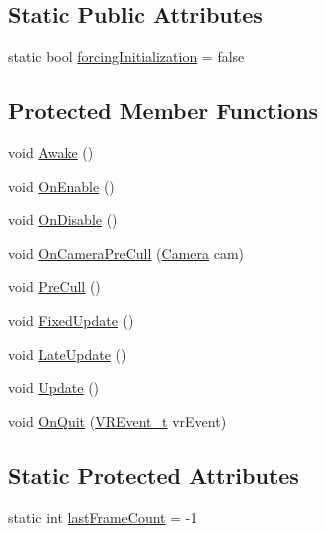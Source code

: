 \subsection*{Static Public Attributes}
\begin{DoxyCompactItemize}
\item 
static bool \mbox{\hyperlink{class_valve_1_1_v_r_1_1_steam_v_r___behaviour_ac7b9c49b43ec24d3bfdb8f73a3573a9e}{forcing\+Initialization}} = false
\end{DoxyCompactItemize}
\subsection*{Protected Member Functions}
\begin{DoxyCompactItemize}
\item 
void \mbox{\hyperlink{class_valve_1_1_v_r_1_1_steam_v_r___behaviour_a7c79ea0aa4fe199c0e06dcd33d3b7a94}{Awake}} ()
\item 
void \mbox{\hyperlink{class_valve_1_1_v_r_1_1_steam_v_r___behaviour_a3b5bca4e8fd04b4cee3c0c221ee91282}{On\+Enable}} ()
\item 
void \mbox{\hyperlink{class_valve_1_1_v_r_1_1_steam_v_r___behaviour_a1c7edbfa56d1eaa665dd898deafc9792}{On\+Disable}} ()
\item 
void \mbox{\hyperlink{class_valve_1_1_v_r_1_1_steam_v_r___behaviour_a675a204e74246ce4dfd640ca1eccc55c}{On\+Camera\+Pre\+Cull}} (\mbox{\hyperlink{namespace_valve_1_1_v_r_a82e5bf501cc3aa155444ee3f0662853fa967d35e40f3f95b1f538bd248640bf3b}{Camera}} cam)
\item 
void \mbox{\hyperlink{class_valve_1_1_v_r_1_1_steam_v_r___behaviour_aeea8b98615fc93aa0dafb5f2271e2a85}{Pre\+Cull}} ()
\item 
void \mbox{\hyperlink{class_valve_1_1_v_r_1_1_steam_v_r___behaviour_a827fab8940ddbc45dfe2f0f6f758240c}{Fixed\+Update}} ()
\item 
void \mbox{\hyperlink{class_valve_1_1_v_r_1_1_steam_v_r___behaviour_a7c5a22782622ec63bf5263e589ad6c21}{Late\+Update}} ()
\item 
void \mbox{\hyperlink{class_valve_1_1_v_r_1_1_steam_v_r___behaviour_a06f2a24a0218f59d8fd92f0ebf28b5bb}{Update}} ()
\item 
void \mbox{\hyperlink{class_valve_1_1_v_r_1_1_steam_v_r___behaviour_a2c20c71ddc268a656beb9850c282122a}{On\+Quit}} (\mbox{\hyperlink{struct_valve_1_1_v_r_1_1_v_r_event__t}{V\+R\+Event\+\_\+t}} vr\+Event)
\end{DoxyCompactItemize}
\subsection*{Static Protected Attributes}
\begin{DoxyCompactItemize}
\item 
static int \mbox{\hyperlink{class_valve_1_1_v_r_1_1_steam_v_r___behaviour_abb86746e7538dda58f98824d47da8db5}{last\+Frame\+Count}} = -\/1
\end{DoxyCompactItemize}
